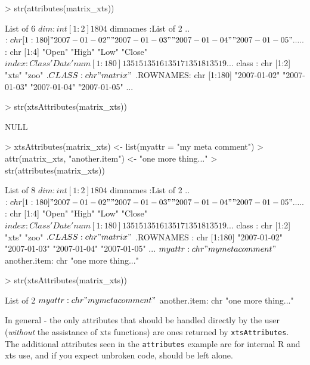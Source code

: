 \documentclass{article}
\begin{document}
\begin{Schunk}
\begin{Sinput}
> str(attributes(matrix_xts))
\end{Sinput}
\begin{Soutput}
List of 6
 $ dim      : int [1:2] 180 4
 $ dimnames :List of 2
  ..$ : chr [1:180] "2007-01-02" "2007-01-03" "2007-01-04" "2007-01-05" ...
  ..$ : chr [1:4] "Open" "High" "Low" "Close"
 $ index    :Class 'Date'  num [1:180] 13515 13516 13517 13518 13519 ...
 $ class    : chr [1:2] "xts" "zoo"
 $ .CLASS   : chr "matrix"
 $ .ROWNAMES: chr [1:180] "2007-01-02" "2007-01-03" "2007-01-04" "2007-01-05" ...
\end{Soutput}
\begin{Sinput}
> str(xtsAttributes(matrix_xts))
\end{Sinput}
\begin{Soutput}
 NULL
\end{Soutput}
\begin{Sinput}
> xtsAttributes(matrix_xts) <- list(myattr = "my meta comment")
> attr(matrix_xts, "another.item") <- "one more thing..."
> str(attributes(matrix_xts))
\end{Sinput}
\begin{Soutput}
List of 8
 $ dim         : int [1:2] 180 4
 $ dimnames    :List of 2
  ..$ : chr [1:180] "2007-01-02" "2007-01-03" "2007-01-04" "2007-01-05" ...
  ..$ : chr [1:4] "Open" "High" "Low" "Close"
 $ index       :Class 'Date'  num [1:180] 13515 13516 13517 13518 13519 ...
 $ class       : chr [1:2] "xts" "zoo"
 $ .CLASS      : chr "matrix"
 $ .ROWNAMES   : chr [1:180] "2007-01-02" "2007-01-03" "2007-01-04" "2007-01-05" ...
 $ myattr      : chr "my meta comment"
 $ another.item: chr "one more thing..."
\end{Soutput}
\begin{Sinput}
> str(xtsAttributes(matrix_xts))
\end{Sinput}
\begin{Soutput}
List of 2
 $ myattr      : chr "my meta comment"
 $ another.item: chr "one more thing..."
\end{Soutput}
\end{Schunk}

In general - the only attributes that should be
handled directly by the user (\emph{without} the assistance
of xts functions) are ones returned by {\tt xtsAttributes}.
The additional attributes seen in the {\tt attributes}
example are for internal R and xts use, and if you expect
unbroken code, should be left alone.
\end{document}
